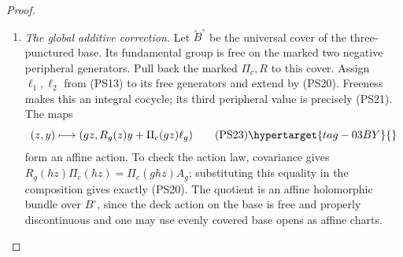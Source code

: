 \begin{proof}
\begin{enumerate}[label=\arabic*.,leftmargin=*]
The affine cocycle convention in (PS16) has multiplication law
\[
                    \ell_{gh}=\ell_g+A_g\ell_h.
 \tag{PS20}\hypertarget{tag-03C0}{}\label{wb:pshift:eq:cocycle-law}
\]
Since $g_0=(g_1g_2)^{-1}$, it gives
\[
\begin{aligned}
 \ell_1+A_1\ell_2
   &=-\frac{3n}{2}\widehat w+\frac n2\widehat\delta,\\
 \ell_0=-A_{g_0}(\ell_1+A_1\ell_2)
   &=\frac{3n}{2}\widehat w-\frac n2\widehat\delta.
\end{aligned}
\tag{PS21}\hypertarget{tag-03C4}{}\label{wb:pshift:eq:cusp-cocycle}
\]
Here $A_{g_0}$ fixes both toric lattice vectors, as is also immediate
from $A_{g_0}=\left(\begin{smallmatrix}I&0\\B_0&I\end{smallmatrix}\right)$.
Put
\[
 q_n=(-3n/2,n/2)^{\mathsf t}\in\mathbb Z^2,
                  \qquad a_0(z)=s(z)q_n.
 \tag{PS22}\hypertarget{tag-03C6}{}\label{wb:pshift:eq:cusp-translation}
\]
Then $a_0(g_0z)-a_0(z)=-q_n=\Pi_c(g_0z)\ell_0$, exactly as
required by (PS16). Exponentiating gives the map
$(x,t_c)\mapsto(t_c^{q_n}x,t_c)$ on the dense cusp torus.
It extends holomorphically and invertibly to the marked infinite fan:
the integral map
\[
 (y,y_3)\longmapsto(y+y_3q_n,y_3)
\]
translates each height-one triangle by the integer vector $q_n$ and
therefore permutes the cones, with inverse given by $-q_n$.
It commutes with the cusp quotient action in (PS19). This proves extension across every cusp stratum.
\item \emph{The global additive correction.}
Let $\widetilde B^\circ$ be
the universal cover of the three-punctured base. Its fundamental group
is free on the marked two negative peripheral generators. Pull back
the marked $\Pi_c,R$ to this cover. Assign $\ell_1,\ell_2$ from
(PS13) to its free generators and extend by (PS20). Freeness makes
this an integral cocycle; its third peripheral value is
precisely (PS21). The maps
\[
 (z,y)\longmapsto
       (gz,R_g(z)y+\Pi_c(gz)\ell_g)
 \tag{PS23}\hypertarget{tag-03BY}{}\label{wb:pshift:eq:affine-bundle-action}
\]
form an affine action. To check the action law, covariance gives
$R_g(hz)\Pi_c(hz)=\Pi_c(ghz)A_g$; substituting this equality
in the composition gives exactly (PS20).
The quotient is an affine holomorphic bundle over $B^\circ$, since
the deck action on the base is free and properly discontinuous and
one may use evenly covered base opens as affine charts.


\end{enumerate}
\end{proof}
